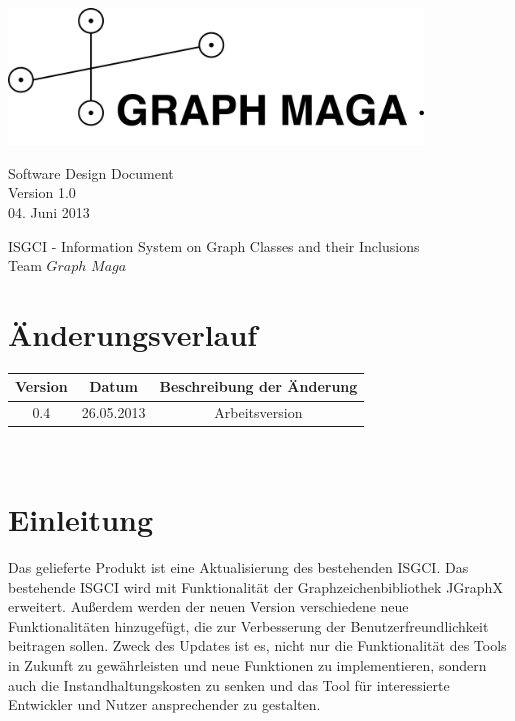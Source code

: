 \documentclass[10pt,a4paper]{article}
\begin{document}
\thispagestyle{empty} %
\begin{center}
\includegraphics*[width=11cm]{Logo.png}
\end{center}


\vspace*{1cm} 
\begin{center}
{\huge Software Design Document}\\
{\large Version 1.0}\\
{\large 04. Juni 2013}\\
\end{center}

\begin{center}
{\large ISGCI - Information System on Graph Classes and their Inclusions}\\
{\large Team $Graph$ $Maga$}
\end{center}


\newpage


\tableofcontents
\newpage
\section{Änderungsverlauf}
\begin{tabular}{|c|c|c|}\hline
 \textbf{Version}&\textbf{Datum}&\textbf{Beschreibung der \"Anderung}\\\hline
 0.4&26.05.2013&Arbeitsversion\\\hline
\end{tabular}\\
\section{Einleitung}
Das gelieferte Produkt ist eine Aktualisierung des bestehenden ISGCI. Das bestehende ISGCI wird mit Funktionalität der Graphzeichenbibliothek JGraphX erweitert. Außerdem werden der neuen Version verschiedene neue Funktionalitäten hinzugefügt, die zur Verbesserung der Benutzerfreundlichkeit beitragen sollen. Zweck des Updates ist es, nicht nur die Funktionalität des Tools in Zukunft zu gewährleisten und neue Funktionen zu implementieren, sondern auch die Instandhaltungskosten zu senken und das Tool für interessierte Entwickler und Nutzer ansprechender zu gestalten.
\end{document}
